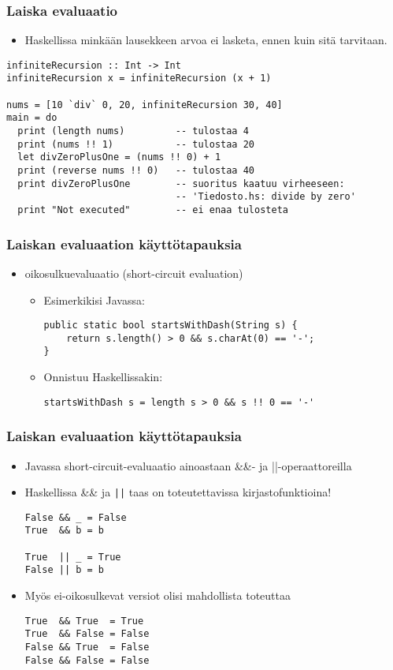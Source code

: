 \documentclass{beamer}
\begin{document}
\begin{frame}[fragile]
\frametitle{Laiska evaluaatio}
\begin{itemize}
\item{Haskellissa minkään lausekkeen arvoa ei lasketa, ennen kuin sitä tarvitaan.}
\end{itemize}
\begin{verbatim}
infiniteRecursion :: Int -> Int
infiniteRecursion x = infiniteRecursion (x + 1)

nums = [10 `div` 0, 20, infiniteRecursion 30, 40]
main = do
  print (length nums)         -- tulostaa 4
  print (nums !! 1)           -- tulostaa 20
  let divZeroPlusOne = (nums !! 0) + 1
  print (reverse nums !! 0)   -- tulostaa 40
  print divZeroPlusOne        -- suoritus kaatuu virheeseen:
                              -- 'Tiedosto.hs: divide by zero'
  print "Not executed"        -- ei enaa tulosteta
\end{verbatim}
\end{frame}

\begin{frame}[fragile]
\frametitle{Laiskan evaluaation käyttötapauksia}
\begin{itemize}
\item{oikosulkuevaluaatio (short-circuit evaluation)}
\begin{itemize}
\item{Esimerkikisi Javassa:}
\begin{verbatim}
public static bool startsWithDash(String s) {
    return s.length() > 0 && s.charAt(0) == '-';
}
\end{verbatim}

\item{Onnistuu Haskellissakin:}
\begin{verbatim}
startsWithDash s = length s > 0 && s !! 0 == '-'
\end{verbatim}

\end{itemize}
\end{itemize}
\end{frame}

\begin{frame}[fragile]
\frametitle{Laiskan evaluaation käyttötapauksia}
\begin{itemize}
\item{Javassa short-circuit-evaluaatio ainoastaan \&\&- ja ||-operaattoreilla}
\item{Haskellissa \&\& ja \verb+||+ taas on toteutettavissa kirjastofunktioina!}

\begin{verbatim}
False && _ = False
True  && b = b

True  || _ = True
False || b = b
\end{verbatim}

\item{Myös ei-oikosulkevat versiot olisi mahdollista toteuttaa}
\begin{verbatim}
True  && True  = True
True  && False = False
False && True  = False
False && False = False
\end{verbatim}
\end{itemize}
\end{frame}
\end{document}
